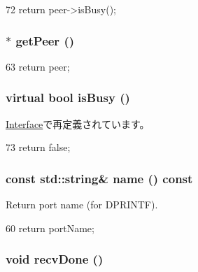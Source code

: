 \begin{DoxyCode}
72 {return peer->isBusy(); }
\end{DoxyCode}
\hypertarget{classEtherInt_a756090fc7fcc4c15a50ad0bd817f5ba7}{
\subsubsection[{getPeer}]{$\ast$ getPeer ()}}
\label{classEtherInt_a756090fc7fcc4c15a50ad0bd817f5ba7}



\begin{DoxyCode}
63 { return peer; }
\end{DoxyCode}
\hypertarget{classEtherInt_ae11cd8f177ca41a395ea873754cb5f9b}{
\subsubsection[{isBusy}]{\setlength{\rightskip}{0pt plus 5cm}virtual bool isBusy ()}}
\label{classEtherInt_ae11cd8f177ca41a395ea873754cb5f9b}


\hyperlink{classEtherLink_1_1Interface_a108b650255e1fff7409a075681e6f46b}{Interface}で再定義されています。


\begin{DoxyCode}
73 { return false; }
\end{DoxyCode}
\hypertarget{classEtherInt_a324e8c54c4c5161913681a1a52fef959}{
\subsubsection[{name}]{\setlength{\rightskip}{0pt plus 5cm}const std::string\& name () const}}
\label{classEtherInt_a324e8c54c4c5161913681a1a52fef959}
Return port name (for DPRINTF). 


\begin{DoxyCode}
60 { return portName; }
\end{DoxyCode}
\hypertarget{classEtherInt_a5087bfa1bf938c500f8eb9d7c3e13eba}{
\subsubsection[{recvDone}]{\setlength{\rightskip}{0pt plus 5cm}void recvDone ()}}
\label{classEtherInt_a5087bfa1bf938c500f8eb9d7c3e13eba}



